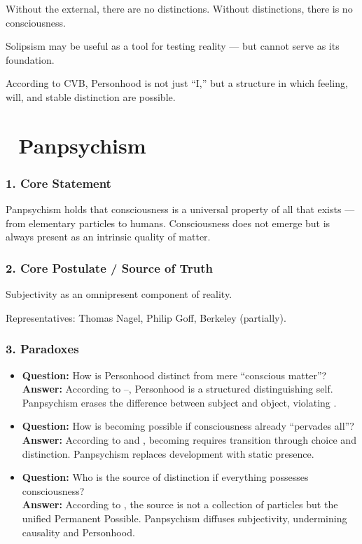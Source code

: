 \documentclass[12pt]{article}
\begin{document}
Without the external, there are no distinctions. Without distinctions, there is no consciousness.

Solipsism may be useful as a tool for testing reality — but cannot serve as its foundation.

According to CVB, Personhood is not just ``I,'' but a structure in which feeling, will, and stable distinction are possible.

\section*{🔷 Panpsychism}

\subsubsection*{1. Core Statement}

Panpsychism holds that consciousness is a universal property of all that exists — from elementary particles to humans. Consciousness does not emerge but is always present as an intrinsic quality of matter.

\subsubsection*{2. Core Postulate / Source of Truth}

Subjectivity as an omnipresent component of reality.

Representatives: Thomas Nagel, Philip Goff, Berkeley (partially).

\subsubsection*{3. Paradoxes}

\begin{itemize}
\item \textbf{Question:} How is Personhood distinct from mere ``conscious matter''?  
\\ \textbf{Answer:} According to \text{[10.1]}–\text{[10.5]}, Personhood is a structured distinguishing self. Panpsychism erases the difference between subject and object, violating \text{[9]}.

\item \textbf{Question:} How is becoming possible if consciousness already ``pervades all''?  
\\ \textbf{Answer:} According to \text{[7]} and \text{[11.6]}, becoming requires transition through choice and distinction. Panpsychism replaces development with static presence.

\item \textbf{Question:} Who is the source of distinction if everything possesses consciousness?  
\\ \textbf{Answer:} According to \text{[6]}, the source is not a collection of particles but the unified Permanent Possible. Panpsychism diffuses subjectivity, undermining causality and Personhood.
\end{itemize}
\end{document}
